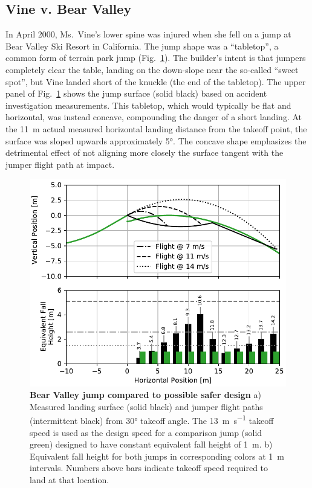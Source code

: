 \documentclass{article}
\begin{document}
\subsection{Vine v. Bear Valley}
%
In April 2000, Ms.~Vine's lower spine was injured when she fell on a jump at
Bear Valley Ski Resort in California. The jump shape was a ``tabletop'', a
common form of terrain park jump (Fig.~\ref{fig:vine-v-bear-valley}).  The
builder's intent is that jumpers completely clear the table, landing on the
down-slope near the so-called ``sweet spot'', but Vine landed short of the
knuckle (the end of the tabletop). The upper panel of
Fig.~\ref{fig:vine-v-bear-valley} shows the jump surface (solid black) based on
accident investigation measurements. This tabletop, which would typically be
flat and horizontal, was instead concave, compounding the danger of a short
landing. At the 11~\si{\meter} actual measured horizontal landing distance from
the takeoff point, the surface was sloped upwards approximately 5\si{\degree}.
The concave shape emphasizes the detrimental effect of not aligning more
closely the surface tangent with the jumper flight path at impact.
%
\begin{figure}
  \centering
  \includegraphics[width=5.25in]{figures/vine-v-bear-valley.pdf}
  \caption{\textbf{Bear Valley jump compared to possible safer design}
  a) Measured landing surface (solid black) and jumper flight paths
  (intermittent black) from 30\si{\degree} takeoff angle. The
  13~\si{\meter\per\second} takeoff speed is used as the design speed for a
  comparison jump (solid green) designed to have constant equivalent fall
  height of 1~\si{\meter}.
  b) Equivalent fall height for both jumps in corresponding
  colors at 1~\si{\meter} intervals. Numbers above bars indicate
  takeoff speed required to land at that location. 
  }
  \label{fig:vine-v-bear-valley}
\end{figure}
\end{document}
